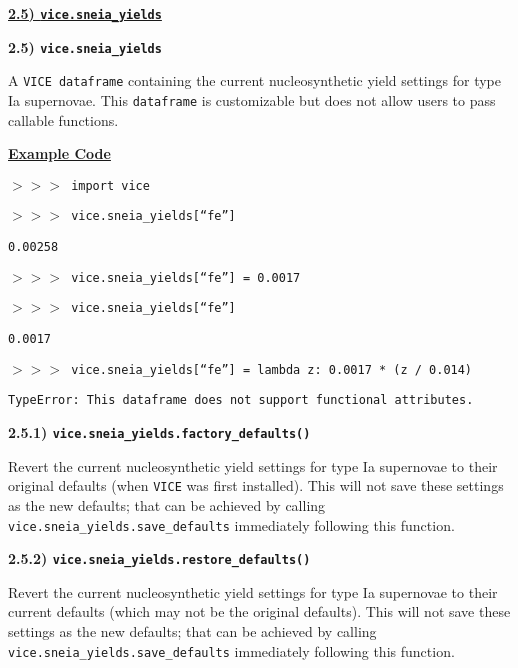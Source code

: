 \documentclass{report}
\begin{document}
\newpage
\noindent 
\begin{center}
\hypertarget{df:sneia_yields}{
	\underline{\LARGE
		\textbf{2.5) \texttt{vice.sneia\_yields}}
	}
}
\end{center}
\hypertarget{df:sneia_yields}{\textbf{2.5) \texttt{vice.sneia\_yields}}} 
\par\noindent 
A \texttt{VICE dataframe} containing the current nucleosynthetic yield settings 
for type Ia supernovae. This \texttt{dataframe} is customizable but does not 
allow users to pass callable functions. 
\par\null\par\noindent 
\underline{\textbf{Example Code}} 
\par\qquad 
\texttt{$>>>$ import vice} \par\noindent 
\texttt{$>>>$ vice.sneia\_yields[``fe'']} \par\noindent 
\texttt{0.00258} \par\noindent 
\texttt{$>>>$ vice.sneia\_yields[``fe''] = 0.0017} \par\noindent 
\texttt{$>>>$ vice.sneia\_yields[``fe'']} \par\noindent 
\texttt{0.0017} \par\noindent 
\texttt{$>>>$ vice.sneia\_yields[``fe''] = lambda z: 0.0017 * (z / 0.014)} 
\par\noindent 
\texttt{TypeError: This dataframe does not support functional attributes.} 
\par\noindent 

\null\par\noindent %
\hypertarget{df:sneia_yields:factory_defaults}{
	\textbf{2.5.1) \texttt{vice.sneia\_yields.factory\_defaults()}}
}
\par\noindent 
Revert the current nucleosynthetic yield settings for type Ia supernovae to 
their original defaults (when \texttt{VICE} was first installed). This will 
not save these settings as the new defaults; that can be achieved by calling 
\texttt{vice.sneia\_yields.save\_defaults} immediately following this function. 

\null\par\noindent %
\hypertarget{df:sneia_yields:restore_defaults}{
	\textbf{2.5.2) \texttt{vice.sneia\_yields.restore\_defaults()}}
}
\par\noindent 
Revert the current nucleosynthetic yield settings for type Ia supernovae to 
their current defaults (which may not be the original defaults). This will 
not save these settings as the new defaults; that can be achieved by calling 
\texttt{vice.sneia\_yields.save\_defaults} immediately following this function. 
\end{document}
